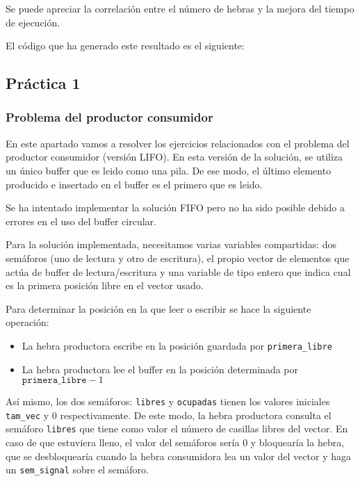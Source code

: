 \documentclass[12pt,a4paper]{article}
\def\code#1{\texttt{#1}}
\begin{document}
Se puede apreciar la correlación entre el número de hebras y la mejora del tiempo de ejecución.

El código que ha generado este resultado es el siguiente:




\subsection{Práctica 1}
\subsubsection{Problema del productor consumidor}
En este apartado vamos a resolver los ejercicios relacionados con el problema del productor consumidor (versión LIFO). En esta versión de la solución, se utiliza un único buffer que es leido como una pila. De ese modo, el último elemento producido e insertado en el buffer es el primero que es leido.

Se ha intentado implementar la solución FIFO pero no ha sido posible debido a errores en el uso del buffer circular.

Para la solución implementada, necesitamos varias variables compartidas: dos semáforos (uno de lectura y otro de escritura), el propio vector de elementos que actúa de buffer de lectura/escritura y una variable de tipo entero que indica cual es la primera posición libre en el vector usado.



Para determinar la posición en la que leer o escribir se hace la siguiente operación:
\begin{itemize}
	\item La hebra productora escribe en la posición guardada por \texttt{primera\_libre}
	\item La hebra productora lee el buffer en la posición determinada por $\texttt{primera\_libre} - 1$
\end{itemize}

Así mismo, los dos semáforos: \texttt{libres} y \texttt{ocupadas} tienen los valores iniciales \code{tam\_vec} y $0$ respectivamente. De este modo, la hebra productora consulta el semáforo \code{libres} que tiene como valor el número de casillas libres del vector. En caso de que estuviera lleno, el valor del semáforos sería $0$ y bloquearía la hebra, que se desbloquearía cuando la hebra consumidora lea un valor del vector y haga un \code{sem\_signal} sobre el semáforo.
\end{document}
